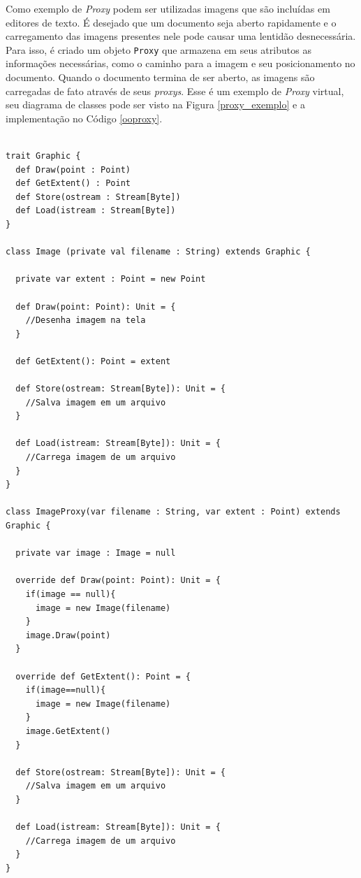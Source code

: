 Como exemplo de \textit{Proxy} podem ser utilizadas 
imagens que são incluídas em editores de 
texto. É desejado que um documento seja aberto 
rapidamente e o carregamento das imagens 
presentes nele pode causar uma lentidão 
desnecessária. Para isso, é criado um objeto 
\texttt{Proxy} que armazena em seus atributos as 
informações necessárias, como o caminho 
para a imagem e seu posicionamento no 
documento. Quando o documento termina de 
ser aberto, as imagens são carregadas de 
fato através de seus \textit{proxys}. Esse é um 
exemplo de \textit{Proxy} virtual, seu diagrama de 
classes pode ser visto na Figura \ref{proxy_exemplo} 
e a implementação no Código \ref{ooproxy}.

\begin{lstlisting}[caption={\textit{Proxy} Orientado a Objetos.},label=ooproxy]

trait Graphic {
  def Draw(point : Point)
  def GetExtent() : Point
  def Store(ostream : Stream[Byte])
  def Load(istream : Stream[Byte])
}

class Image (private val filename : String) extends Graphic {

  private var extent : Point = new Point

  def Draw(point: Point): Unit = {
    //Desenha imagem na tela
  }

  def GetExtent(): Point = extent

  def Store(ostream: Stream[Byte]): Unit = {
    //Salva imagem em um arquivo
  }

  def Load(istream: Stream[Byte]): Unit = {
    //Carrega imagem de um arquivo
  }
}

class ImageProxy(var filename : String, var extent : Point) extends Graphic {

  private var image : Image = null

  override def Draw(point: Point): Unit = {
    if(image == null){
      image = new Image(filename)
    }
    image.Draw(point)
  }

  override def GetExtent(): Point = {
    if(image==null){
      image = new Image(filename)
    }
    image.GetExtent()
  }

  def Store(ostream: Stream[Byte]): Unit = {
    //Salva imagem em um arquivo
  }

  def Load(istream: Stream[Byte]): Unit = {
    //Carrega imagem de um arquivo
  }
}

\end{lstlisting}

